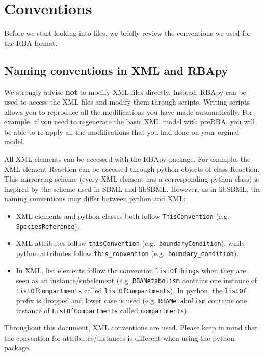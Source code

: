 \documentclass[12pt]{scrartcl}
\begin{document}
\section{Conventions}

Before we start looking into files, we briefly review the conventions we used for the RBA format.

\subsection{Naming conventions in XML and RBApy}

We strongly advise \textbf{not} to modify XML files directly.
Instead, RBApy can be used to access the XML files and modify them through scripts.
Writing scripts allows you to reproduce all the modifications you have made automatically.
For example, if you need to regenerate the basic XML model with preRBA, you will be able
to re-apply all the modifications that you had done on your orginal model.

All XML elements can be accessed with the RBApy package.
For example, the XML element Reaction can be accessed through python objects
of class Reaction.
This mirrorring scheme (every XML element has a corresponding python class) is
inspired by the scheme used in SBML and libSBML.
However, as in libSBML, the naming conventions may differ between python and XML:

\begin{itemize}
  \item XML elements and python classes both follow \texttt{ThisConvention} (e.g. \texttt{SpeciesReference}).
  \item XML attributes follow \texttt{thisConvention} (e.g.\ \texttt{boundaryCondition}), while
    python attributes follow \texttt{this\_convention} (e.g.\ \texttt{boundary\_condition}).
  \item In XML, list elements follow the convention \texttt{listOfThings}
    when they are seen as an instance/subelement
    (e.g. \texttt{RBAMetabolism} contains one instance of \texttt{ListOfCompartments} called \texttt{listOfCompartments}).
    In python, the \texttt{listOf} prefix is dropped and lower case is used
    (e.g. \texttt{RBAMetabolism} contains one instance of \texttt{ListOfCompartments} called \texttt{compartments}).
\end{itemize}

Throughout this document, XML conventions are used.
Please keep in mind that the convention for attributes/instances is different when using the
python package.
\end{document}
